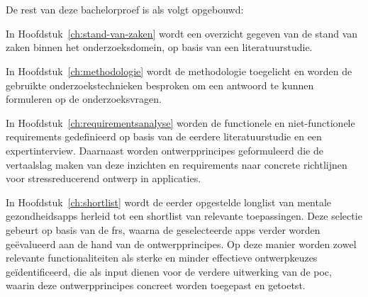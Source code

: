 \section{}%
\label{sec:opzet-bachelorproef}

\vspace{1em}


De rest van deze bachelorproef is als volgt opgebouwd:

\vspace{1em}

In Hoofdstuk~\ref{ch:stand-van-zaken} wordt een overzicht gegeven van de stand van zaken binnen het onderzoeksdomein, op basis van een literatuurstudie.

\vspace{1em}

In Hoofdstuk~\ref{ch:methodologie} wordt de methodologie toegelicht en worden de gebruikte onderzoekstechnieken besproken om een antwoord te kunnen formuleren op de onderzoeksvragen.


\vspace{1em}

In Hoofdstuk~\ref{ch:requirementsanalyse} worden de functionele en niet-functionele requirements gedefinieerd op basis van de eerdere literatuurstudie en een expertinterview. Daarnaast worden ontwerpprincipes geformuleerd die de vertaalslag maken van deze inzichten en requirements naar concrete richtlijnen voor stressreducerend ontwerp in applicaties.

\vspace{1em}

In Hoofdstuk~\ref{ch:shortlist} wordt de eerder opgestelde longlist van mentale gezondheidsapps herleid tot een shortlist van relevante toepassingen. Deze selectie gebeurt op basis van de \acrlong{fr}s, waarna de geselecteerde apps verder worden geëvalueerd aan de hand van de ontwerpprincipes. Op deze manier worden zowel relevante functionaliteiten als sterke en minder effectieve ontwerpkeuzes geïdentificeerd, die als input dienen voor de verdere uitwerking van de \acrshort{poc}, waarin deze ontwerpprincipes concreet worden toegepast en getoetst.

